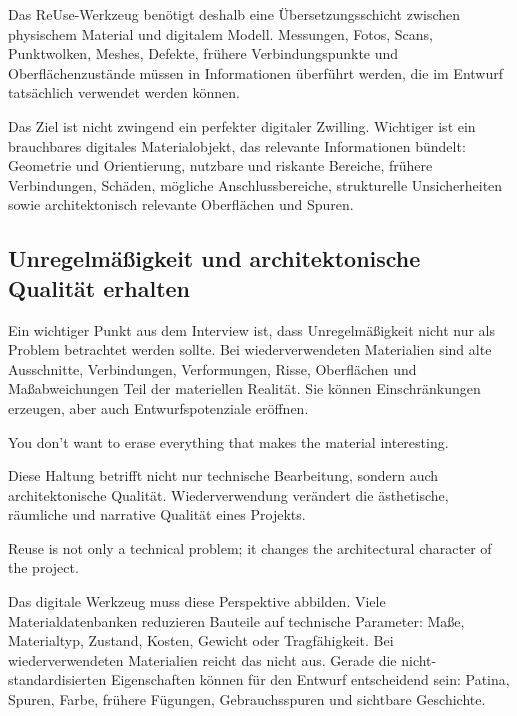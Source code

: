 Das ReUse-Werkzeug benötigt deshalb eine Übersetzungsschicht zwischen physischem Material und digitalem Modell. Messungen, Fotos, Scans, Punktwolken, Meshes, Defekte, frühere Verbindungspunkte und Oberflächenzustände müssen in Informationen überführt werden, die im Entwurf tatsächlich verwendet werden können.

Das Ziel ist nicht zwingend ein perfekter digitaler Zwilling. Wichtiger ist ein brauchbares digitales Materialobjekt, das relevante Informationen bündelt: Geometrie und Orientierung, nutzbare und riskante Bereiche, frühere Verbindungen, Schäden, mögliche Anschlussbereiche, strukturelle Unsicherheiten sowie architektonisch relevante Oberflächen und Spuren.

\subsection{Unregelmäßigkeit und architektonische Qualität erhalten}

Ein wichtiger Punkt aus dem Interview ist, dass Unregelmäßigkeit nicht nur als Problem betrachtet werden sollte. Bei wiederverwendeten Materialien sind alte Ausschnitte, Verbindungen, Verformungen, Risse, Oberflächen und Maßabweichungen Teil der materiellen Realität. Sie können Einschränkungen erzeugen, aber auch Entwurfspotenziale eröffnen.

\begin{Blockquote}
You don't want to erase everything that makes the material interesting.
\end{Blockquote}

Diese Haltung betrifft nicht nur technische Bearbeitung, sondern auch architektonische Qualität. Wiederverwendung verändert die ästhetische, räumliche und narrative Qualität eines Projekts.

\begin{Blockquote}
Reuse is not only a technical problem; it changes the architectural character of the project.
\end{Blockquote}

Das digitale Werkzeug muss diese Perspektive abbilden. Viele Materialdatenbanken reduzieren Bauteile auf technische Parameter: Maße, Materialtyp, Zustand, Kosten, Gewicht oder Tragfähigkeit. Bei wiederverwendeten Materialien reicht das nicht aus. Gerade die nicht-standardisierten Eigenschaften können für den Entwurf entscheidend sein: Patina, Spuren, Farbe, frühere Fügungen, Gebrauchsspuren und sichtbare Geschichte.

